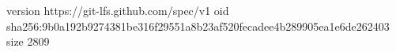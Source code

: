 version https://git-lfs.github.com/spec/v1
oid sha256:9b0a192b9274381be316f29551a8b23af520fecadee4b289905ea1e6de262403
size 2809
